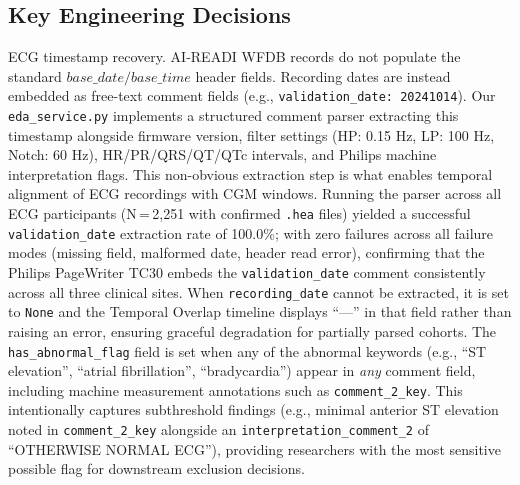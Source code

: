 \documentclass[conference]{IEEEtran}
\begin{document}
\subsection{Key Engineering Decisions}
ECG timestamp recovery. AI-READI WFDB records do not populate the standard $base\_date/base\_time$ header fields. Recording dates are instead embedded as free-text comment fields (e.g., \texttt{validation\_date: 20241014}). Our \texttt{eda\_service.py} implements a structured comment parser extracting this timestamp alongside firmware version, filter settings (HP: 0.15 Hz, LP: 100 Hz, Notch: 60 Hz), HR/PR/QRS/QT/QTc intervals, and Philips machine interpretation flags. This non-obvious extraction step is what enables temporal alignment of ECG recordings with CGM windows. Running the parser across all ECG participants (N\,=\,2,251 with confirmed \texttt{.hea} files) yielded a successful \texttt{validation\_date} extraction rate of 100.0\%; with zero failures across all failure modes (missing field, malformed date, header read error), confirming that the Philips PageWriter TC30 embeds the \texttt{validation\_date} comment consistently across all three clinical sites. When \texttt{recording\_date} cannot be extracted, it is set to \texttt{None} and the Temporal Overlap timeline displays ``---'' in that field rather than raising an error, ensuring graceful degradation for partially parsed cohorts. The \texttt{has\_abnormal\_flag} field is set when any of the abnormal keywords (e.g., ``ST elevation'', ``atrial fibrillation'', ``bradycardia'') appear in \textit{any} comment field, including machine measurement annotations such as
\texttt{comment\_2\_key}. This intentionally captures subthreshold findings (e.g., minimal anterior ST elevation noted in \texttt{comment\_2\_key} alongside an \texttt{interpretation\_comment\_2} of ``OTHERWISE NORMAL ECG''), providing researchers with the most sensitive possible flag for downstream exclusion decisions.
\end{document}

